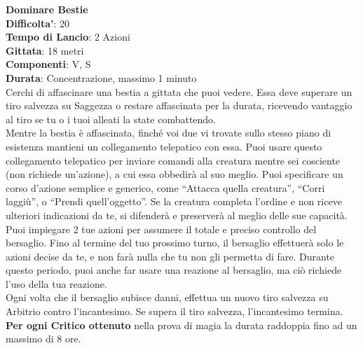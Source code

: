 \begin{multicols}{2}
\medskip\textbf{Dominare Bestie}\\
\textbf{Difficolta'}: 20\\
\textbf{Tempo di Lancio}: 2 Azioni\\
\textbf{Gittata}: 18 metri\\
\textbf{Componenti}: V, S\\
\textbf{Durata}: Concentrazione, massimo 1 minuto\\
Cerchi di affascinare una bestia a gittata che puoi vedere. Essa deve superare un tiro salvezza su Saggezza o restare affascinata per la durata, ricevendo vantaggio al tiro se tu o i tuoi alleati la state combattendo.\\
Mentre la bestia è affascinata, finché voi due vi trovate sullo stesso piano di esistenza mantieni un collegamento telepatico con essa. Puoi usare questo collegamento telepatico per inviare comandi alla creatura mentre sei cosciente (non richiede un’azione),
a cui essa obbedirà al suo meglio. Puoi specificare un corso d’azione semplice e generico, come “Attacca quella creatura”, “Corri laggiù”, o “Prendi quell’oggetto”. Se la creatura completa l’ordine e non riceve ulteriori indicazioni da te, si difenderà e preserverà al meglio delle sue capacità.\\
Puoi impiegare 2 tue azioni per assumere il totale e preciso controllo del bersaglio. Fino al termine del tuo prossimo turno, il bersaglio effettuerà solo le azioni decise da te, e non farà nulla che tu non gli permetta di fare. Durante questo periodo, puoi anche far usare una reazione al bersaglio, ma ciò richiede l’uso della tua reazione.\\
Ogni volta che il bersaglio subisce danni, effettua un nuovo tiro salvezza su Arbitrio contro l’incantesimo. Se supera il tiro salvezza, l’incantesimo termina.\\
\textbf{Per ogni Critico ottenuto} nella prova di magia la durata raddoppia fino ad un massimo di 8 ore.


\end{multicols}
